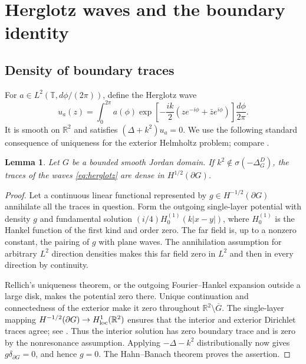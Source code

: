 \documentclass[11pt]{amsart}
\numberwithin{equation}{section}
\newtheorem{lemma}[theorem]{Lemma}
\newcommand{\T}{\mathbb T}
\begin{document}
\section{Herglotz waves and the boundary identity}\label{sec:boundary}

\subsection{Density of boundary traces}
For $a\in L^2(\T,d\phi/(2\pi))$, define the Herglotz wave
\begin{equation}\label{eq:herglotz}
 u_a(z)=\int_0^{2\pi}a(\phi)
 \exp\left[-\frac{ik}{2}(ze^{-i\phi}+\bar z e^{i\phi})\right]
 \frac{d\phi}{2\pi}.
\end{equation}
It is smooth on $\mathbb R^2$ and satisfies $(\Delta+k^2)u_a=0$.
We use the following standard consequence of uniqueness for the
exterior Helmholtz problem; compare \cite{CK,EP}.

\begin{lemma}\label{lem:density}
Let $G$ be a bounded smooth Jordan domain. If
$k^2\notin\sigma(-\Delta_G^D)$, the traces of the waves
\eqref{eq:herglotz} are dense in $H^{1/2}(\partial G)$.
\end{lemma}

\begin{proof}
Let a continuous linear functional represented by
$g\in H^{-1/2}(\partial G)$ annihilate all the traces in question.
Form the outgoing single-layer potential with density $g$ and
fundamental solution $(i/4)H_0^{(1)}(k|x-y|)$, where $H_0^{(1)}$
is the Hankel function of the first kind and order zero.
The far field is, up to a nonzero constant, the pairing of $g$
with plane waves. The annihilation assumption for arbitrary
$L^2$ direction densities makes this far field zero in $L^2$
and then in every direction by continuity.

Rellich's uniqueness theorem, or the outgoing Fourier--Hankel
expansion outside a large disk, makes the potential zero there.
Unique continuation and connectedness of the exterior make it zero
throughout $\mathbb R^2\setminus\overline G$.
The single-layer mapping
$H^{-1/2}(\partial G)\to H^1_{\rm loc}(\mathbb R^2)$ ensures that
the interior and exterior Dirichlet traces agree; see
\cite[Section 3]{EP}. Thus the interior solution has zero boundary
trace and is zero by the nonresonance assumption. Applying
$-\Delta-k^2$ distributionally now gives
$g\delta_{\partial G}=0$, and hence $g=0$.
The Hahn--Banach theorem proves the assertion.
\end{proof}
\end{document}
